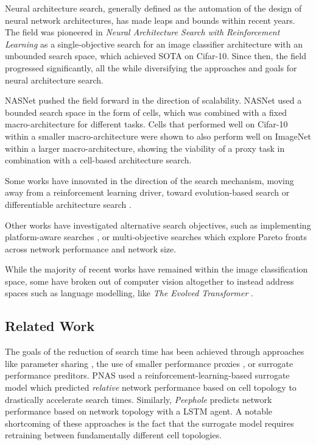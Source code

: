 \documentclass[twocolumn]{article}
\begin{document}
Neural architecture search, generally defined as the automation of the design of neural network architectures, has made leaps and bounds within recent years.
The field was pioneered in \emph{Neural Architecture Search with Reinforcement Learning} \cite{rl_nas} as a single-objective search for an image classifier architecture 
with an unbounded search space, which achieved SOTA on Cifar-10.
Since then, the field progressed significantly, all the while diversifying the approaches and goals for neural architecture search.

NASNet \cite{nasnet} pushed the field forward in the direction of scalability.
NASNet used a bounded search space in the form of cells, which was combined with a fixed macro-architecture for different tasks.
Cells that performed well on Cifar-10 within a smaller macro-architecture were shown to also perform well on ImageNet within a larger macro-architecture,
showing the viability of a proxy task in combination with a cell-based architecture search.

Some works have innovated in the direction of the search mechanism, moving away from a reinforcement learning driver, toward evolution-based search\cite{amoebanet}
or differentiable architecture search \cite{darts}.

Other works have investigated alternative search objectives, such as implementing platform-aware searches \cite{mnas} \cite{hardware_darts}, 
or multi-objective searches \cite{lemonade} which explore Pareto fronts across network performance and network size.

While the majority of recent works have remained within the image classification space, some have broken out of computer vision
altogether to instead address spaces such as language modelling, like \emph{The Evolved Transformer} \cite{evolved_transformer}.


\subsection{Related Work}

The goals of the reduction of search time has been achieved through approaches like parameter sharing \cite{enas} \cite{cars},
the use of smaller performance proxies \cite{econas}, or surrogate performance preditors.
PNAS used a reinforcement-learning-based surrogate model which predicted \emph{relative} network performance based on cell topology to drastically
accelerate search times. 
Similarly, \emph{Peephole} \cite{peephole} predicts network performance based on network topology with a LSTM agent.
A notable shortcoming of these approaches is the fact that the surrogate model requires retraining between fundamentally different cell topologies.
\end{document}
